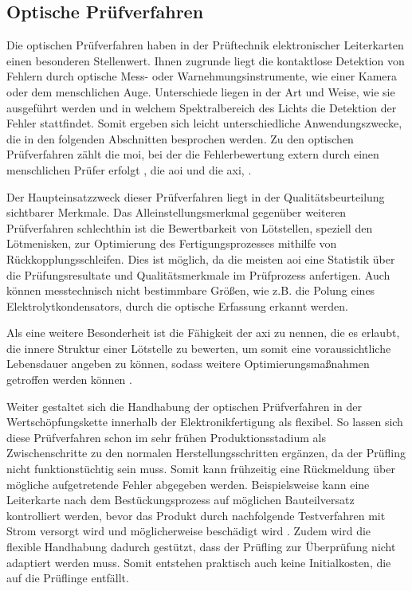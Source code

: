 \subsection{Optische Prüfverfahren}
    Die optischen Prüfverfahren haben in der Prüftechnik elektronischer Leiterkarten einen besonderen Stellenwert.
    Ihnen zugrunde liegt die kontaktlose Detektion von Fehlern durch optische Mess- oder Warnehmungsinstrumente, wie einer Kamera oder dem menschlichen Auge.
    Unterschiede liegen in der Art und Weise, wie sie ausgeführt werden und in welchem Spektralbereich des Lichts die Detektion der Fehler stattfindet.
    Somit ergeben sich leicht unterschiedliche Anwendungszwecke, die in den folgenden Abschnitten besprochen werden.
    Zu den optischen Prüfverfahren zählt die \ac{moi}, bei der die Fehlerbewertung extern durch einen menschlichen Prüfer erfolgt \cite{berger_test-_2012}, die \ac{aoi}  und die \ac{axi}, .

    Der Haupteinsatzzweck dieser Prüfverfahren liegt in der Qualitätsbeurteilung sichtbarer Merkmale. 
    Das Alleinstellungsmerkmal gegenüber weiteren Prüfverfahren schlechthin ist die Bewertbarkeit von Lötstellen, speziell den Lötmenisken, zur Optimierung des Fertigungsprozesses mithilfe von Rückkopplungsschleifen.
    Dies ist möglich, da die meisten \ac{aoi} eine Statistik über die Prüfungsresultate und Qualitätsmerkmale im Prüfprozess anfertigen.
    Auch können messtechnisch nicht bestimmbare Größen, wie z.B. die Polung eines Elektrolytkondensators, durch die optische Erfassung erkannt werden. \cite{berger_test-_2012}

    Als eine weitere Besonderheit ist die Fähigkeit der \ac{axi} zu nennen, die es erlaubt, die innere Struktur einer Lötstelle zu bewerten, um somit eine voraussichtliche Lebensdauer angeben zu können, sodass weitere Optimierungsmaßnahmen getroffen werden können \cite{berger_test-_2012}.

    Weiter gestaltet sich die Handhabung der optischen Prüfverfahren in der Wertschöpfungskette innerhalb der Elektronikfertigung als flexibel.
    So lassen sich diese Prüfverfahren schon im sehr frühen Produktionsstadium als Zwischenschritte zu den normalen Herstellungsschritten ergänzen, da der Prüfling nicht funktionstüchtig sein muss. 
    Somit kann frühzeitig eine Rückmeldung über mögliche aufgetretende Fehler abgegeben werden. \cite{berger_test-_2012}
    Beispielsweise kann eine Leiterkarte nach dem Bestückungsprozess auf möglichen Bauteilversatz kontrolliert werden, bevor das Produkt durch nachfolgende Testverfahren mit Strom versorgt wird und möglicherweise beschädigt wird \cite{blunk_testverfahren_nodate}.
    Zudem wird die flexible Handhabung dadurch gestützt, dass der Prüfling zur Überprüfung nicht adaptiert werden muss.
    Somit entstehen praktisch auch keine Initialkosten, die auf die Prüflinge entfällt. \cite{berger_test-_2012}

